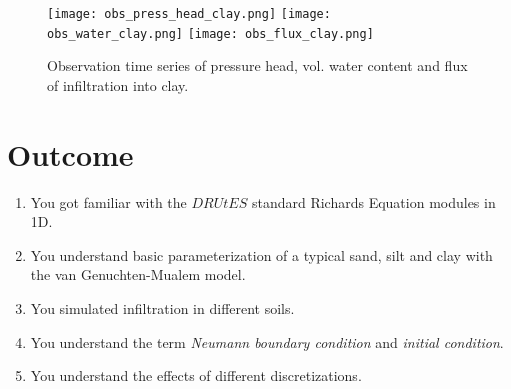 \documentclass[
10pt, %
a4paper, %
oneside, %
headinclude,footinclude, %
BCOR5mm, %
]{scrartcl}
\begin{document}
\begin{figure}
\centering
\texttt{[image: obs\_press\_head\_clay.png]}
\texttt{[image: obs\_water\_clay.png]}
\texttt{[image: obs\_flux\_clay.png]}
\caption{Observation time series of pressure head, vol. water content and flux of infiltration into clay.}

\end{figure}

\newpage
\newpage
\newpage
\newpage
\section{Outcome}
\begin{enumerate}
\item You got familiar with the $DRUtES$ standard Richards Equation modules in 1D.
\item You understand basic parameterization of a typical sand, silt and clay with the van Genuchten-Mualem model.
\item You simulated infiltration in different soils.
\item You understand the term \emph{Neumann boundary condition} and \emph{initial condition}.
\item You understand the effects of different discretizations.
\end{enumerate}





%


\end{document}
